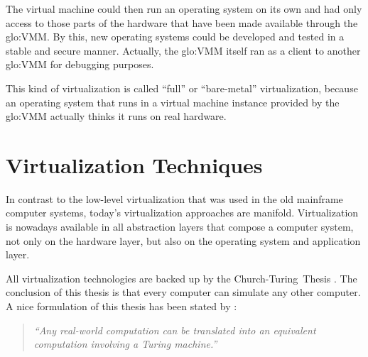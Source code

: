 The virtual machine could then run  an operating system on its own and had
only access to  those parts of the hardware that  have been made available
through  the  \gls{glo:VMM}.  By  this,  new  operating  systems could  be
developed  and  tested in  a  stable  and  secure manner.   Actually,  the
\gls{glo:VMM}  itself  ran  as  a  client  to  another  \gls{glo:VMM}  for
debugging purposes.

This  kind   of  virtualization  is  called   ``full''  or  ``bare-metal''
virtualization, because an operating system that runs in a virtual machine
instance provided  by the  \gls{glo:VMM} actually thinks  it runs  on real
hardware.

\section{Virtualization Techniques}
\label{sec:virtualization-techniques}

In  contrast to  the low-level  virtualization that  was used  in  the old
mainframe   computer  systems,   today's  virtualization   approaches  are
manifold.  Virtualization is nowadays  available in all abstraction layers
that compose  a computer system, \ie  not only on the  hardware layer, but
also on the operating system and application layer.

All virtualization technologies are  backed up by the Church-Turing~Thesis
\cite{turing36,  church36}. The conclusion  of this  thesis is  that every
computer  can simulate  any other  computer.  A  nice formulation  of this
thesis has been stated by \citet{church_turing_thesis}:

\begin{quotation}
  \emph{``Any real-world computation can be translated into an equivalent
    computation involving a Turing machine.''}
\end{quotation}



